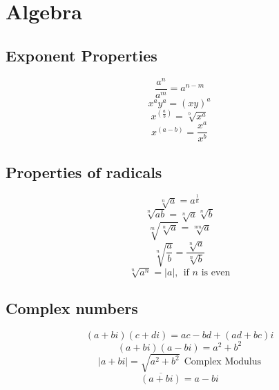 \documentclass{article}
\begin{document}
\section{Algebra}
	\subsection{Exponent Properties}
		\begin{equation}
			\frac{a^n}{a^m} = a^{n-m}
		\end{equation}
		\begin{equation}
			x^a y^a = \left( {xy} \right)^a
		\end{equation}
		\begin{equation}
			x^{\left( {\frac{a}{b}} \right)} = \sqrt[b]{{x^a }}
		\end{equation}
		\begin{equation}
			x^{\left( {a - b} \right)} = \frac{{x^a }}{{x^b }}
		\end{equation}
	\subsection{Properties of radicals}
		\begin{equation}
			\sqrt[n]{a} = a^{\frac{1}{n}}
		\end{equation}
		\begin{equation}
			\sqrt[n]{ab} = \sqrt[n]{a}\sqrt[n]{b}
		\end{equation}
		\begin{equation}
			\sqrt[m]{\sqrt[n]{a}} = \sqrt[nm]{a}
		\end{equation}
		\begin{equation}
			\sqrt[n]{\frac{a}{b}} = \frac{\sqrt[n]{a}}{\sqrt[n]{b}}
		\end{equation}
		\begin{equation}
			\sqrt[n]{a^n} = |a|, \ \ \mbox{if $n$ is even}
		\end{equation}
	\subsection{Complex numbers}
		\begin{equation}
			(a+bi)(c+di) =  ac-bd+(ad+bc)i
		\end{equation}
		\begin{equation}
			(a+bi)(a-bi) =  a^2 + b^2
		\end{equation}
		\begin{equation}
			|a + bi| = \sqrt{a^2+b^2} \ \ \mbox{Complex Modulus}
		\end{equation}
		\begin{equation}
			\overline{(a+bi)}=a-bi
		\end{equation}
\end{document}
